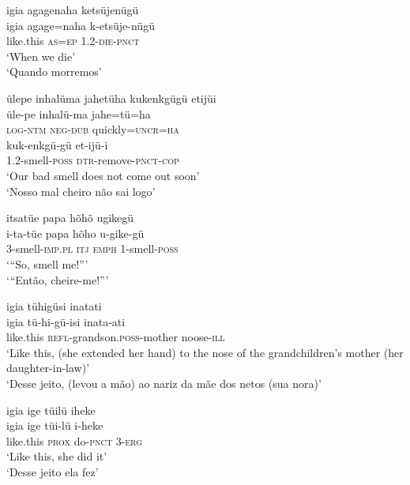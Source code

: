\documentclass[output=paper,
modfonts,nonflat
]{langsci/langscibook}
\begin{document}
\ea igia agagenaha ketsüjenügü \\[.3em]
\gll igia		agage=naha	k-etsüje-nügü \\
like.this 	\textsc{as=ep} 		1.2-\textsc{die-pnct} \\
\glt ‘When we die’ \\
‘Quando morremos’ \\
\z

\newpage 
\ea ülepe inhalüma jahetüha kukenkgügü etijüi \\[.3em]
\gll üle-pe		inhalü-ma	jahe=tü=ha \\
\textsc{log-ntm} 	\textsc{neg-dub} 	quickly=\textsc{uncr=ha} \\
\gll kuk-enkgü-gü		et-ijü-i \\
1.2-smell\textsc{-poss} 	\textsc{dtr-}remove-\textsc{pnct-cop} \\
\glt ‘Our bad smell does not come out soon’ \\
‘Nosso mal cheiro não sai logo’ \\
\z

\ea itsatüe papa hõhõ ugikegü \\[.3em]
\gll i-ta{\footnotemark}{}-tüe 		papa	hõho	 u-gike-gü \\
3-smell-\textsc{imp.pl} 	\textsc{itj} 	\textsc{emph}	1-smell-\textsc{poss} \\
\glt ‘“So, smell me!”’ \\
‘“Então, cheire-me!”’ \\
\z

\ea igia tühigüsi inatati \\[.3em]
\gll igia		tü-hi-gü-isi				inata-ati \\
like.this 	\textsc{refl}-grandson.\textsc{poss}-mother 	noose-\textsc{ill} \\
\glt ‘Like this, (she extended her hand) to the nose of the grandchildren's mother (her daughter-in-law)' \\
‘Desse jeito, (levou a mão) ao nariz da mãe dos netos (sua nora)’ \\
\z

\ea igia ige tüilü iheke \\[.3em]
\gll igia ige			tüi-lü		i-heke \\
like.this \textsc{prox} 	do-\textsc{pnct} 	\textsc{3-erg} \\
\glt ‘Like this, she did it’ \\
‘Desse jeito ela fez’ \\
\z
\end{document}
